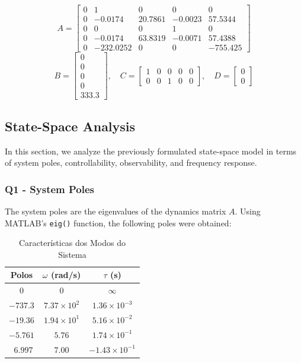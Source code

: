 \[
A =
\begin{bmatrix}
    0 & 1 & 0 & 0 & 0 \\
    0 & -0.0174 & 20.7861 & -0.0023 & 57.5344 \\
    0 & 0 & 0 & 1 & 0 \\
    0 & -0.0174 & 63.8319 & -0.0071 & 57.4388 \\
    0 & -232.0252 & 0 & 0 & -755.425
\end{bmatrix}
\]
\[
B = 
\begin{bmatrix} 0 \\ 0 \\ 0 \\ 0 \\ 333.3 \end{bmatrix}, \quad
C = 
\begin{bmatrix} 1 & 0 & 0 & 0 & 0 \\ 0 & 0 & 1 & 0 & 0 \end{bmatrix}, \quad
D = 
\begin{bmatrix} 0 \\ 0 \end{bmatrix}
\]
\subsection{State-Space Analysis}

\par In this section, we analyze the previously formulated state-space model in terms of system poles, controllability, observability, and frequency response.
\\
\subsubsection{Q1 - System Poles}

\par The system poles are the eigenvalues of the dynamics matrix $A$. Using MATLAB's \texttt{eig()} function, the following poles were obtained:

\begin{table}[h]
\centering
\caption{Características dos Modos do Sistema}
\footnotesize
\renewcommand{\arraystretch}{1.3}
\setlength{\tabcolsep}{7pt}
\begin{tabular}{ccc}
\toprule
Polos & $\omega$ (rad/s) & $\tau$ (s) \\
\midrule
$0$ & 0 & $\infty$ \\
$-737.3$ & $7.37 \times 10^{2}$ & $1.36 \times 10^{-3}$  \\
$-19.36$ & $1.94 \times 10^{1}$ & $5.16 \times 10^{-2}$  \\
$-5.761$ & $5.76$ & $1.74 \times 10^{-1}$ \\
$\ \ 6.997$ & $7.00$ & $-1.43 \times 10^{-1}$  \\
\bottomrule
\end{tabular}
\label{modos_sistema}
\end{table}


